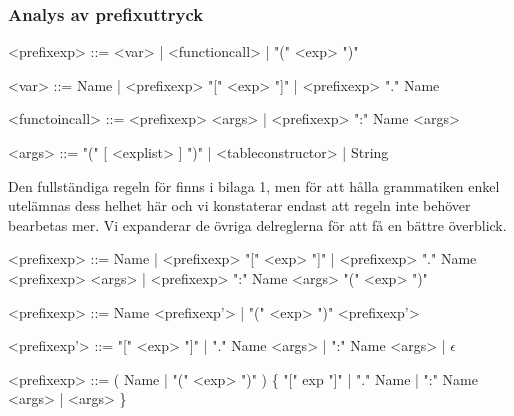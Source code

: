 \subsubsection{Analys av prefixuttryck}

\begin{description}
  \setlength{\grammarindent}{8em}
  \item[Ursprungsregel] \hfill
    \begin{grammar}
      \singlespace\small%
      \selectfont
      <prefixexp> ::= <var> | <functioncall> | "(" <exp> ")"

      <var> ::= Name | <prefixexp> "[" <exp> "]" | <prefixexp> "." Name

      <functoincall> ::= <prefixexp> <args> | <prefixexp> ":" Name <args>

      <args> ::= "(" [ <explist> ] ")" | <tableconstructor> | String
    \end{grammar}

    Den fullständiga regeln för  finns i bilaga 1, men för
    att hålla grammatiken enkel utelämnas dess helhet här och vi konstaterar
    endast att regeln inte behöver bearbetas mer. Vi expanderar de övriga
    delreglerna för att få en bättre överblick.

    \begin{grammar}
      \singlespace\small%
      \selectfont
      <prefixexp> ::= Name | <prefixexp> "[" <exp> "]" | <prefixexp> "." Name
        \alt <prefixexp> <args> | <prefixexp> ":" Name <args>
        \alt "(" <exp> ")"
    \end{grammar}

  \item[Eliminering av vänsterrekursion] \hfill
    \begin{grammar}
      \singlespace\small%
      \selectfont
      <prefixexp> ::= Name <prefixexp'> | "(" <exp> ")" <prefixexp'>

      <prefixexp'> ::= "[" <exp> "]" | "." Name <args> | ":" Name <args> |
      $\epsilon$
    \end{grammar}

  \item[Resultat] \hfill
    \begin{grammar}
      \singlespace\small%
      \selectfont
      <prefixexp> ::= ( Name | "(" <exp> ")" ) \{ "[" exp "]" | "." Name |
          ":" Name <args> | <args> \}
    \end{grammar}
\end{description}

